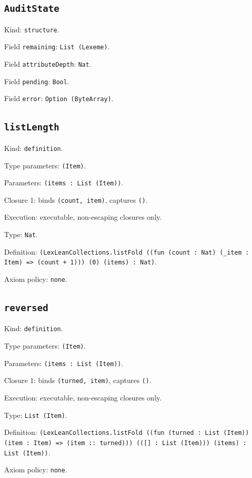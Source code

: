 \documentclass[11pt]{article}
\begin{document}
\subsection*{\texttt{AuditState}}
\noindent Kind: \texttt{structure}.\par
\noindent Field \texttt{remaining}: \texttt{List (Lexeme)}.\par
\noindent Field \texttt{attributeDepth}: \texttt{Nat}.\par
\noindent Field \texttt{pending}: \texttt{Bool}.\par
\noindent Field \texttt{error}: \texttt{Option (ByteArray)}.\par
\subsection*{\texttt{listLength}}
\noindent Kind: \texttt{definition}.\par
\noindent Type parameters: \texttt{(Item)}.\par
\noindent Parameters: \texttt{(items : List (Item))}.\par
\noindent Closure 1: binds \texttt{(count, item)}, captures \texttt{()}.\par
\noindent Execution: executable, non-escaping closures only.\par
\noindent Type: \texttt{Nat}.\par
\noindent Definition: \texttt{(LexLeanCollections.listFold ((fun (count : Nat) (\_item : Item) => (count + 1))) (0) (items) : Nat)}.\par
\noindent Axiom policy: \texttt{none}.\par
\subsection*{\texttt{reversed}}
\noindent Kind: \texttt{definition}.\par
\noindent Type parameters: \texttt{(Item)}.\par
\noindent Parameters: \texttt{(items : List (Item))}.\par
\noindent Closure 1: binds \texttt{(turned, item)}, captures \texttt{()}.\par
\noindent Execution: executable, non-escaping closures only.\par
\noindent Type: \texttt{List (Item)}.\par
\noindent Definition: \texttt{(LexLeanCollections.listFold ((fun (turned : List (Item)) (item : Item) => (item :: turned))) (([] : List (Item))) (items) : List (Item))}.\par
\noindent Axiom policy: \texttt{none}.\par
\end{document}
